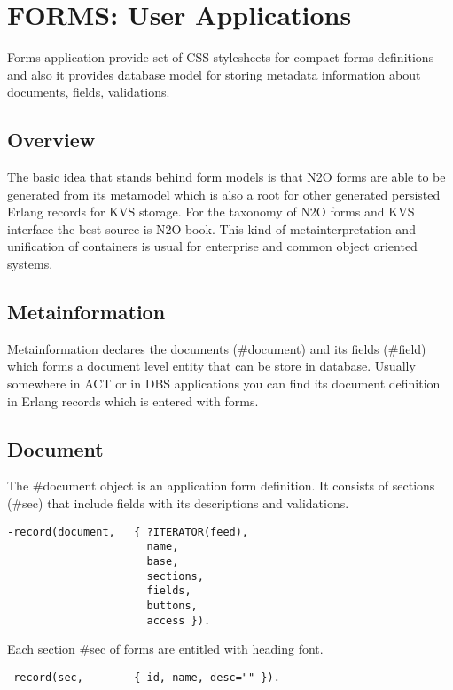 \section{FORMS: User Applications}
Forms application provide set of CSS stylesheets for compact forms definitions
and also it provides database model for storing metadata information about
documents, fields, validations.

\subsection{Overview}
The basic idea that stands behind form models is that N2O forms are able to be
generated from its metamodel which is also a root for other generated
persisted Erlang records for KVS storage. For the taxonomy of N2O forms and KVS interface
the best source is N2O book. This kind of metainterpretation and unification of
containers is usual for enterprise and common object oriented systems.

\subsection{Metainformation}
Metainformation declares the documents (#document) and its
fields (#field) which forms a document level entity that can
be store in database. Usually somewhere in ACT or in DBS
applications you can find its document definition in Erlang
records which is entered with forms.

\subsection{Document}
The #document object is an application form definition.
It consists of sections (#sec) that include fields with
its descriptions and validations.

\vspace{1\baselineskip}
\begin{lstlisting}
-record(document,   { ?ITERATOR(feed),
                      name,
                      base,
                      sections,
                      fields,
                      buttons,
                      access }).
\end{lstlisting}

Each section #sec of forms are entitled with heading font.

\vspace{1\baselineskip}
\begin{lstlisting}
-record(sec,        { id, name, desc="" }).
\end{lstlisting}

